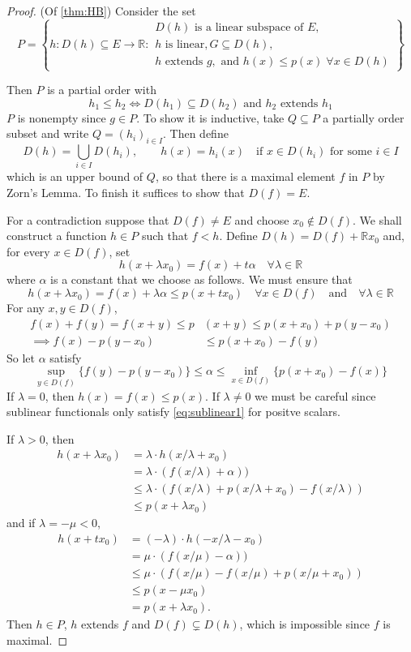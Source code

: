 \documentclass{article}
\theoremstyle{definition}
\numberwithin{equation}{section}
\newcommand{\R}{\mathbb{R}}
\begin{document}
	\begin{proof} (Of \cref{thm:HB})
		Consider the set
		\[P=\left\{h:D(h)\subseteq E\to\R:\substack{D(h)\text{ is a linear subspace of }E,\\
			h\text{ is linear},G\subseteq D(h),\\
			h\text{ extends }g,\text{ and }h(x)\leq p(x)\;\forall x\in D(h)
		}\right\}\]
		
		Then $P$ is a partial order with
		\[h_1\leq h_2\iff D(h_1)\subseteq D(h_2)\text{ and }h_2\text{ extends }h_1\]
		$P$ is nonempty since $g\in P$. To show it is inductive, take $Q\subseteq P$ a partially order subset and write $Q=(h_i)_{i\in I}$. Then define
		\[D(h)=\bigcup_{i\in I}D(h_i),\qquad h(x)=h_i(x)\quad\text{if }x\in D(h_i) \text{ for some }i\in I\]
		which is an upper bound of $Q$, so that there is a maximal element $f$ in $P$ by Zorn's Lemma. To finish it suffices to show that $D(f)=E$.
		
		For a contradiction suppose that $D(f)\neq E$ and choose $x_0\notin D(f)$. We shall construct a function $h\in P$ such that $f<h$. Define $D(h)=D(f)+\R x_0$ and, for every $x\in D(f)$, set
		\[h(x+\lambda x_0)=f(x)+t\alpha\quad \forall \lambda\in\R\]
		where $\alpha$ is a constant that we choose as follows. We must ensure that
		\[h(x+\lambda x_0)=f(x)+\lambda\alpha\leq p(x+tx_0)\quad\forall x\in D(f)\quad\text{and}\quad\forall \lambda\in\R\]
		For any $x,y\in D(f)$,
		\begin{align*}
			f(x)+f(y)=f(x+y)\leq p&(x+y)\leq p(x+x_0)+p(y-x_0)\\
			\implies f(x)-p(y-x_0)&\leq p(x+x_0)-f(y)
		\end{align*}
		So let $\alpha$ satisfy
		\[\sup_{y\in D(f)}\{f(y)-p(y-x_0)\}\leq\alpha\leq\inf_{x\in D(f)}\{p(x+x_0)-f(x)\}\]
		If $\lambda =0$, then $h(x)=f(x)\leq p(x)$. If $\lambda\neq0$ we must be careful since sublinear functionals only satisfy \cref{eq:sublinear1} for positve scalars.
		
		If $\lambda >0$, then 
		\begin{align*}
			h(x+\lambda x_0)&=\lambda\cdot h(x/\lambda+x_0)\\
			&=\lambda\cdot(f(x/\lambda)+\alpha))\\
			&\leq \lambda\cdot(f(x/\lambda)+p(x/\lambda+x_0)-f(x/\lambda))\\
			&\leq p(x+\lambda x_0)
		\end{align*}
		and if $\lambda=-\mu<0$,
		\begin{align*}
			h(x+tx_0)&=(-\lambda)\cdot h(-x/\lambda-x_0)\\
			&=\mu\cdot(f(x/\mu)-\alpha))\\
			&\leq \mu\cdot(f(x/\mu)-f(x/\mu)+p(x/\mu+x_0))\\
			&\leq p(x-\mu x_0)\\
			&=p(x+\lambda x_0).
		\end{align*}
		Then $h\in P$, $h$ extends $f$ and $D(f)\subsetneq D(h)$, which is impossible since $f$ is maximal.
	\end{proof}
	
\end{document}
